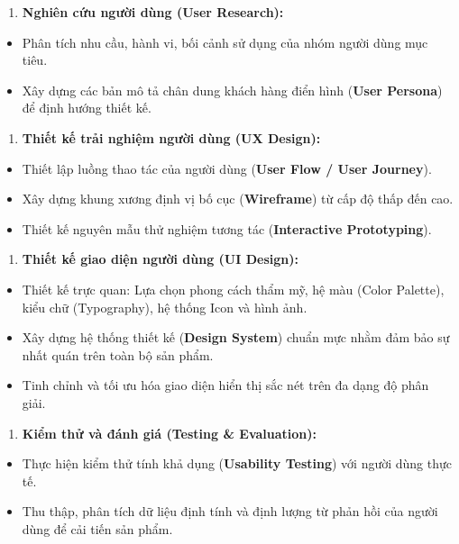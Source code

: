\documentclass[11pt,a4paper,oneside]{report}
\begin{document}
\begin{enumerate}[leftmargin=1.5em]
\item \textbf{Nghiên cứu người dùng (User Research):}
\end{enumerate}
\begin{itemize}[leftmargin=1.5em]
\item Phân tích nhu cầu, hành vi, bối cảnh sử dụng của nhóm người dùng mục tiêu.
\item Xây dựng các bản mô tả chân dung khách hàng điển hình (\textbf{User Persona}) để định hướng thiết kế.
\end{itemize}
\begin{enumerate}[leftmargin=1.5em]
\item \textbf{Thiết kế trải nghiệm người dùng (UX Design):}
\end{enumerate}
\begin{itemize}[leftmargin=1.5em]
\item Thiết lập luồng thao tác của người dùng (\textbf{User Flow / User Journey}).
\item Xây dựng khung xương định vị bố cục (\textbf{Wireframe}) từ cấp độ thấp đến cao.
\item Thiết kế nguyên mẫu thử nghiệm tương tác (\textbf{Interactive Prototyping}).
\end{itemize}
\begin{enumerate}[leftmargin=1.5em]
\item \textbf{Thiết kế giao diện người dùng (UI Design):}
\end{enumerate}
\begin{itemize}[leftmargin=1.5em]
\item Thiết kế trực quan: Lựa chọn phong cách thẩm mỹ, hệ màu (Color Palette), kiểu chữ (Typography), hệ thống Icon và hình ảnh.
\item Xây dựng hệ thống thiết kế (\textbf{Design System}) chuẩn mực nhằm đảm bảo sự nhất quán trên toàn bộ sản phẩm.
\item Tinh chỉnh và tối ưu hóa giao diện hiển thị sắc nét trên đa dạng độ phân giải.
\end{itemize}
\begin{enumerate}[leftmargin=1.5em]
\item \textbf{Kiểm thử và đánh giá (Testing \& Evaluation):}
\end{enumerate}
\begin{itemize}[leftmargin=1.5em]
\item Thực hiện kiểm thử tính khả dụng (\textbf{Usability Testing}) với người dùng thực tế.
\item Thu thập, phân tích dữ liệu định tính và định lượng từ phản hồi của người dùng để cải tiến sản phẩm.
\end{itemize}
\end{document}

